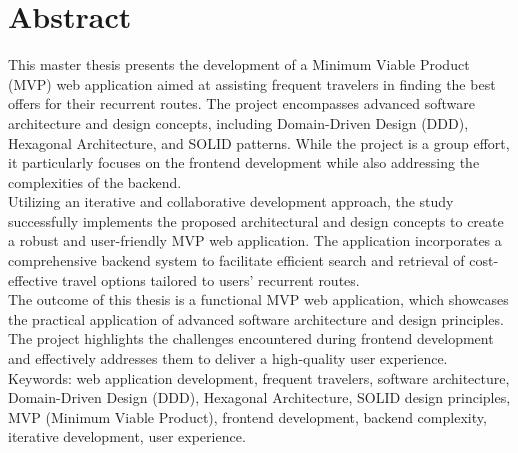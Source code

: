 \documentclass[a4paper, 11pt, oneside]{book}
\date{}
\begin{document}
\section*{Abstract}
This master thesis presents the development of a Minimum Viable Product (MVP)
web application aimed at assisting frequent travelers in finding the best offers
for their recurrent routes. The project encompasses advanced software
architecture and design concepts, including Domain-Driven Design (DDD),
Hexagonal Architecture, and SOLID patterns. While the project is a group effort,
it particularly focuses on the frontend development while also addressing the
complexities of the backend.
\\[8pt]
Utilizing an iterative and collaborative development approach, the study
successfully implements the proposed architectural and design concepts to create
a robust and user-friendly MVP web application. The application incorporates a
comprehensive backend system to facilitate efficient search and retrieval of
cost-effective travel options tailored to users' recurrent routes.
\\[8pt]
The outcome of this thesis is a functional MVP web application, which showcases
the practical application of advanced software architecture and design
principles. The project highlights the challenges encountered during frontend
development and effectively addresses them to deliver a high-quality user
experience.
\\[16pt]
Keywords: web application development, frequent travelers, software
architecture, Domain-Driven Design (DDD), Hexagonal Architecture, SOLID design
principles, MVP (Minimum Viable Product), frontend development, backend
complexity, iterative development, user experience.
\newpage
\end{document}
